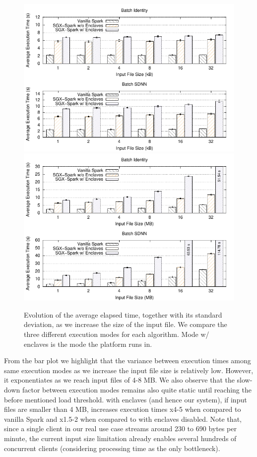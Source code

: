 \begin{figure}[h!]
    \centering
    \includegraphics[width=.85\textwidth]{plots/batch/input_size/input_size.pdf}
    \includegraphics[width=.85\textwidth]{plots/batch/input_size/big_input_size.pdf}
    \caption[Evolution of the average elapsed (execution) time as the input workload increases.]{Evolution of the average elapsed time, together with its standard deviation, as we increase the size of the input file. We compare the three different execution modes for each algorithm. Mode \sgxspark w/ enclaves is the mode the platform runs in. \label{fig:batch-input-size}}
\end{figure}

From the bar plot we highlight that the variance between execution times among same execution modes as we increase the input file size is relatively low. 
However, it exponentiates as we reach input files of 4-8 MB.
We also observe that the slow-down factor between execution modes remains also quite static until reaching the before mentioned load threshold. 
\sgxspark with enclaves (and hence our system), if input files are smaller than 4 MB, increases execution times x4-5 when compared to vanilla Spark and x1.5-2 when compared to \sgxspark with enclaves disabled.
Note that, since a single client in our real use case streams around 230 to 690 bytes per minute, the current input size limitation already enables several hundreds of concurrent clients (considering processing time as the only bottleneck).

